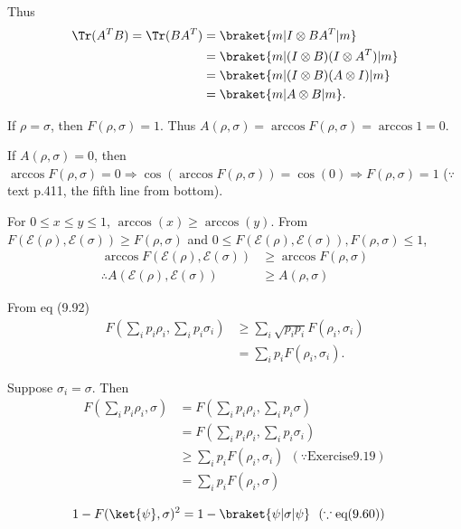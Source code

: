 Thus
\begin{align*}
    \Tr (A^T B) = \Tr(BA^T) &= \braket{m | I \otimes BA^T |m}\\
    &= \braket{m | (I \otimes B)(I \otimes A^T) |m}\\
    &= \braket{m | (I \otimes B)(A \otimes I) |m}\\ 
    &= \braket{m | A \otimes B | m}.
\end{align*}

If $\rho = \sigma$, then $F(\rho, \sigma) = 1$. Thus $A(\rho, \sigma) = \arccos F(\rho, \sigma) = \arccos 1 = 0$.

If $A(\rho, \sigma) = 0$, then $\arccos F(\rho, \sigma) = 0 \Rightarrow \cos (\arccos F(\rho, \sigma)) = \cos(0) \Rightarrow F(\rho, \sigma) = 1$ ($\because$ text p.411, the fifth line from bottom).


For $0 \leq x \leq y \leq 1$, $\arccos(x) \geq \arccos(y)$. From $F(\mathcal{E}(\rho), \mathcal{E}(\sigma)) \geq F(\rho, \sigma)$ and $0 \leq F(\mathcal{E}(\rho), \mathcal{E}(\sigma)), F(\rho, \sigma) \leq 1$,
\begin{align*}
    \arccos F(\mathcal{E}(\rho), \mathcal{E}(\sigma)) &\geq \arccos F(\rho, \sigma)\\
    \therefore A (\mathcal{E}(\rho), \mathcal{E}(\sigma)) &\geq A(\rho, \sigma)
\end{align*}



From eq (9.92)
\begin{align*}
    F \left( \sum_i p_i \rho_i, \sum_i p_i \sigma_i \right) &\geq \sum_i \sqrt{p_i p_i} F(\rho_i, \sigma_i)\\
        &= \sum_i p_i F(\rho_i, \sigma_i).
\end{align*}


Suppose $\sigma_i = \sigma$. Then
\begin{align*}
    F \left( \sum_i p_i \rho_i, \sigma \right) &= F \left( \sum_i p_i \rho_i, \sum_i p_i \sigma \right) \\
        &= F \left( \sum_i p_i \rho_i, \sum_i p_i \sigma_i \right) \\
        &\geq \sum_i p_i F(\rho_i, \sigma_i)~~(\because \text{Exercise}  9.19)\\
        &= \sum_i p_i F(\rho_i, \sigma)
\end{align*}


\begin{align*}
    1 - F(\ket{\psi} ,\sigma)^2 &= 1 - \braket{\psi | \sigma | \psi} ~~(\because \text{eq} (9.60))
\end{align*}


